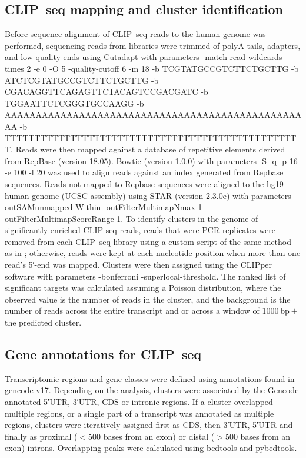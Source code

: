 \subsection{CLIP–seq mapping and cluster identification}
Before sequence alignment of CLIP–seq reads to the human genome was performed, sequencing reads from libraries were trimmed of polyA tails, adapters, and low quality ends using Cutadapt with parameters -match-read-wildcards -times 2 -e 0 -O 5 -quality-cutoff 6 -m 18 -b TCGTATGCCGTCTTCTGCTTG -b ATCTCGTATGCCGTCTTCTGCTTG -b CGACAGGTTCAGAGTTCTACAGTCCGACGATC -b TGGAATTCTCGGGTGCCAAGG -b AAAAAAAAAAAAAAAAAAAAAAAAAAAAAAAAAAAAAAAAAAAAAAAAAA -b TTTTTTTTTTTTTTTTTTTTTTTTTTTTTTTTTTTTTTTTTTTTTTTTTT. Reads were then mapped against a database of repetitive elements derived from RepBase (version 18.05). Bowtie (version 1.0.0) with parameters -S -q -p 16 -e 100 -l 20 was used to align reads against an index generated from Repbase sequences\cite{Langmead2009}. Reads not mapped to Repbase sequences were aligned to the hg19 human genome (UCSC assembly) using STAR (version 2.3.0e)\cite{Dobin2013a} with parameters -outSAMunmapped Within -outFilterMultimapNmax 1 -outFilterMultimapScoreRange 1. To identify clusters in the genome of significantly enriched CLIP-seq reads, reads that were PCR replicates were removed from each CLIP–seq library using a custom script of the same method as in \cite{Darnell2012}; otherwise, reads were kept at each nucleotide position when more than one read’s 5′-end was mapped. Clusters were then assigned using the CLIPper software with parameters -bonferroni -superlocal-threshold\cite{Lovci2013}. The ranked list of significant targets was calculated assuming a Poisson distribution, where the observed value is the number of reads in the cluster, and the background is the number of reads across the entire transcript and or across a window of 1000 bp $\pm$ the predicted cluster.

\subsection{Gene annotations for CLIP–seq}
Transcriptomic regions and gene classes were defined using annotations found in gencode v17. Depending on the analysis, clusters were associated by the Gencode-annotated 5′UTR, 3′UTR, CDS or intronic regions. If a cluster overlapped multiple regions, or a single part of a transcript was annotated as multiple regions, clusters were iteratively assigned first as CDS, then 3′UTR, 5′UTR and finally as proximal ($<$500 bases from an exon) or distal ($>$500 bases from an exon) introns. Overlapping peaks were calculated using bedtools and pybedtools\cite{Quinlan2010, Dale2011a}.

